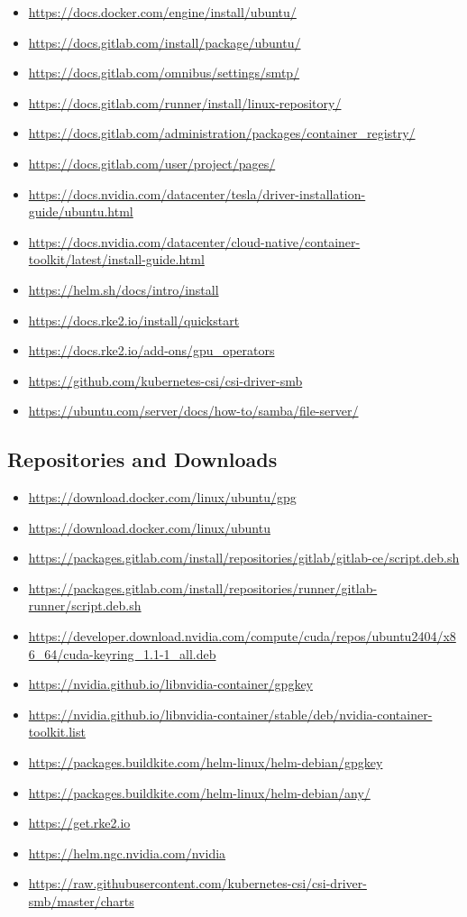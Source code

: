 \documentclass{article}
\begin{document}
\begin{itemize}
	\item \url{https://docs.docker.com/engine/install/ubuntu/}
	\item \url{https://docs.gitlab.com/install/package/ubuntu/}
	\item \url{https://docs.gitlab.com/omnibus/settings/smtp/}
	\item \url{https://docs.gitlab.com/runner/install/linux-repository/}
	\item \url{https://docs.gitlab.com/administration/packages/container_registry/}
	\item \url{https://docs.gitlab.com/user/project/pages/}
	\item \url{https://docs.nvidia.com/datacenter/tesla/driver-installation-guide/ubuntu.html}
	\item \url{https://docs.nvidia.com/datacenter/cloud-native/container-toolkit/latest/install-guide.html}
	\item \url{https://helm.sh/docs/intro/install}
	\item \url{https://docs.rke2.io/install/quickstart}
	\item \url{https://docs.rke2.io/add-ons/gpu_operators}
	\item \url{https://github.com/kubernetes-csi/csi-driver-smb}
	\item \url{https://ubuntu.com/server/docs/how-to/samba/file-server/}
\end{itemize}

\subsection{Repositories and Downloads}

\begin{itemize}
	\item \url{https://download.docker.com/linux/ubuntu/gpg}
	\item \url{https://download.docker.com/linux/ubuntu}
	\item \url{https://packages.gitlab.com/install/repositories/gitlab/gitlab-ce/script.deb.sh}
	\item \url{https://packages.gitlab.com/install/repositories/runner/gitlab-runner/script.deb.sh}
	\item \url{https://developer.download.nvidia.com/compute/cuda/repos/ubuntu2404/x86_64/cuda-keyring_1.1-1_all.deb}
	\item \url{https://nvidia.github.io/libnvidia-container/gpgkey}
	\item \url{https://nvidia.github.io/libnvidia-container/stable/deb/nvidia-container-toolkit.list}
	\item \url{https://packages.buildkite.com/helm-linux/helm-debian/gpgkey}
	\item \url{https://packages.buildkite.com/helm-linux/helm-debian/any/}
	\item \url{https://get.rke2.io}
	\item \url{https://helm.ngc.nvidia.com/nvidia}
	\item \url{https://raw.githubusercontent.com/kubernetes-csi/csi-driver-smb/master/charts}
\end{itemize}
\end{document}
